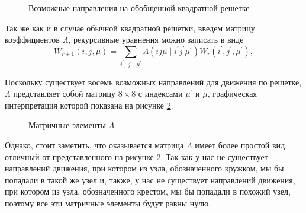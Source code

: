 \documentclass[utf8,12pt]{jetp}
\begin{document}
\begin{figure}[h]
	\caption{Возможные направления на обобщенной квадратной решетке}
	\label{dirgen}
\end{figure}

Так же как и в случае обычной квадратной решетки, введем матрицу коэффициентов $\Lambda$, рекурсивные уравнения можно записать в виде
\begin{equation}
W_{r+1}(i, j, \mu) = \sum_{i^{'},\; j^{'},\; \mu^{'}} \Lambda (ij\mu\; |\; i^{'}j^{'}\mu^{'}) W_{r} (i^{'}, j^{'}, \mu^{'}),
\end{equation}

Поскольку существует восемь возможных направлений для движения по решетке, $\Lambda$ представляет собой матрицу $8 \times 8$ с индексами $\mu^{'}$ и $\mu$, графическая интерпретация которой показана на рисунке \ref{matxgen}. 

\begin{figure}[h]
	\caption{Матричные элементы $\Lambda$}
	\label{matxgen}
\end{figure}

Однако, стоит заметить, что оказывается матрица $\Lambda$ имеет более простой вид, отличный от представленного на рисунке  \ref{matxgen}. Так как у нас не существует направлений движения, при котором из узла, обозначенного кружком, мы бы попадали в такой же узел и, также, у нас не существует направлений движения, при котором из узла, обозначенного крестом, мы бы попадали в похожий узел, поэтому все эти матричные элементы будут равны нулю.
\end{document}
